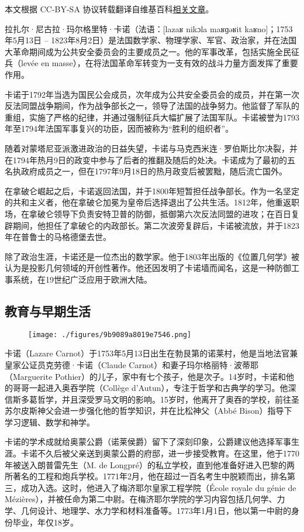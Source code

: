 
本文根据 CC-BY-SA 协议转载翻译自维基百科\href{https://en.wikipedia.org/wiki/Lazare_Carnot#References}{相关文章}。


拉扎尔·尼古拉·玛尔格里特·卡诺（法语：[lazaʁ nikɔla maʁɡəʁit kaʁno]；1753年5月13日 – 1823年8月2日）是法国数学家、物理学家、军官、政治家，并在法国大革命期间成为公共安全委员会的主要成员之一。他的军事改革，包括实施全民征兵（levée en masse），在将法国革命军转变为一支有效的战斗力量方面发挥了重要作用。

卡诺于1792年当选为国民公会成员，次年成为公共安全委员会的成员，并在第一次反法同盟战争期间，作为战争部长之一，领导了法国的战争努力。他监督了军队的重组，实施了严格的纪律，并通过强制征兵大幅扩展了法国军队。卡诺被誉为1793年至1794年法国军事复兴的功臣，因而被称为“胜利的组织者”。

随着对蒙塔尼亚派激进政治的日益失望，卡诺与马克西米连·罗伯斯比尔决裂，并在1794年热月9日的政变中参与了后者的推翻及随后的处决。卡诺成为了最初的五名执政府成员之一，但在1797年9月18日的热月政变后被罢黜，随后流亡国外。

在拿破仑崛起之后，卡诺返回法国，并于1800年短暂担任战争部长。作为一名坚定的共和主义者，他在拿破仑加冕为皇帝后选择退出了公共生活。1812年，他重返职场，在拿破仑领导下负责安特卫普的防御，抵御第六次反法同盟的进攻；在百日复辟期间，他担任了拿破仑的内政部长。第二次波旁复辟后，卡诺被流放，并于1823年在普鲁士的马格德堡去世。

除了政治生涯，卡诺还是一位杰出的数学家。他于1803年出版的《位置几何学》被认为是投影几何领域的开创性著作。他还因发明了卡诺墙而闻名，这是一种防御工事系统，在19世纪广泛应用于欧洲大陆。
\subsection{教育与早期生活}  
\begin{figure}[ht]
\centering
\texttt{[image: ./figures/9b9089a8019e7546.png]}
\caption{} \label{fig_Lazare_1}
\end{figure}
卡诺（Lazare Carnot）于1753年5月13日出生在勃艮第的诺莱村，他是当地法官兼皇家公证员克劳德·卡诺（Claude Carnot）和妻子玛尔格丽特·波蒂耶（Marguerite Pothier）的儿子，家中有七个孩子，他是次子。14岁时，卡诺和他的哥哥一起进入奥吞学院（Collège d'Autun），专注于哲学和古典学的学习。他深信斯多葛哲学，并且深受罗马文明的影响。15岁时，他离开了奥吞的学校，前往圣苏尔皮斯神父会进一步强化他的哲学知识，并在比松神父（Abbé Bison）指导下学习逻辑、数学和神学。

卡诺的学术成就给奥蒙公爵（诺莱侯爵）留下了深刻印象，公爵建议他选择军事生涯。卡诺不久后被父亲送到奥蒙公爵的府邸，进一步接受教育。在这里，他于1770年被送入朗普雷先生（M. de Longpré）的私立学校，直到他准备好进入巴黎的两所著名的工程和炮兵学校。1771年2月，他在超过一百名考生中脱颖而出，排名第三，成功入选。这时，他进入了梅济耶尔皇家工程学院（École royale du génie de Mézières），并被任命为第二中尉。在梅济耶尔学院的学习内容包括几何学、力学、几何设计、地理学、水力学和材料准备等。1773年1月1日，他以第一中尉的身份毕业，年仅18岁。

